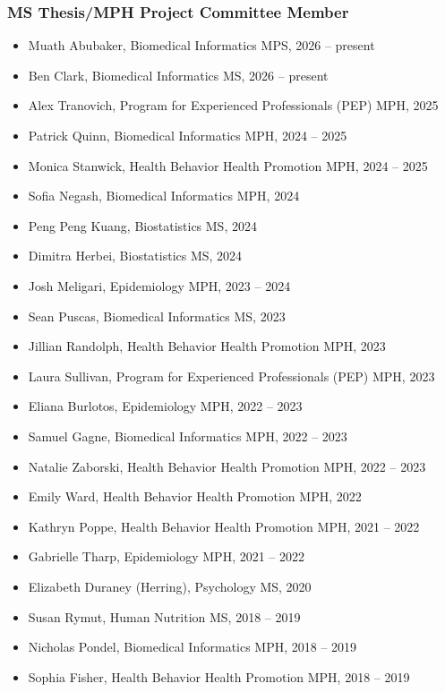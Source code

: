 \documentclass[
  english,
  letterpaper,
  DIV=11,
  numbers=noendperiod]{scrartcl}
\providecommand{\tightlist}{%
  \setlength{\itemsep}{0pt}\setlength{\parskip}{0pt}}
\begin{document}
\subsubsection{MS Thesis/MPH Project Committee
Member}\label{ms-thesismph-project-committee-member}

\begin{itemize}
\tightlist
\item
  Muath Abubaker, Biomedical Informatics MPS, 2026 -- present
\item
  Ben Clark, Biomedical Informatics MS, 2026 -- present
\item
  Alex Tranovich, Program for Experienced Professionals (PEP) MPH, 2025
\item
  Patrick Quinn, Biomedical Informatics MPH, 2024 -- 2025
\item
  Monica Stanwick, Health Behavior Health Promotion MPH, 2024 -- 2025
\item
  Sofia Negash, Biomedical Informatics MPH, 2024
\item
  Peng Peng Kuang, Biostatistics MS, 2024
\item
  Dimitra Herbei, Biostatistics MS, 2024
\item
  Josh Meligari, Epidemiology MPH, 2023 -- 2024
\item
  Sean Puscas, Biomedical Informatics MS, 2023
\item
  Jillian Randolph, Health Behavior Health Promotion MPH, 2023
\item
  Laura Sullivan, Program for Experienced Professionals (PEP) MPH, 2023
\item
  Eliana Burlotos, Epidemiology MPH, 2022 -- 2023
\item
  Samuel Gagne, Biomedical Informatics MPH, 2022 -- 2023
\item
  Natalie Zaborski, Health Behavior Health Promotion MPH, 2022 -- 2023
\item
  Emily Ward, Health Behavior Health Promotion MPH, 2022
\item
  Kathryn Poppe, Health Behavior Health Promotion MPH, 2021 -- 2022
\item
  Gabrielle Tharp, Epidemiology MPH, 2021 -- 2022
\item
  Elizabeth Duraney (Herring), Psychology MS, 2020
\item
  Susan Rymut, Human Nutrition MS, 2018 -- 2019
\item
  Nicholas Pondel, Biomedical Informatics MPH, 2018 -- 2019
\item
  Sophia Fisher, Health Behavior Health Promotion MPH, 2018 -- 2019

\end{itemize}
\end{document}
